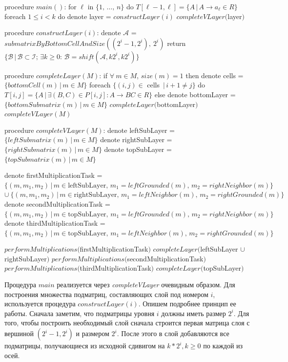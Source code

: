 \documentclass[a4paper,12pt]{article}  %
\theoremstyle{definition}
\theoremstyle{remark}
\begin{document}
\begin{algorithm}[caption={Модифицорованный алгоритм синтаксического анализа}, label={alg:modified}]
procedure $main()$:
  for $\ell$ in $\{1,\,\dots,\,n\}$ do
    $T[\ell-1, \ell] = \{A\,|\,A \to a_{\ell} \in R\}$
  foreach $1 \leqslant i < k$ do
    denote layer = $constructLayer(i)$
    $completeVLayer($layer$)$ 

procedure $constructLayer(i)$:
  denote $\mathcal{A}$ = $submatrixByBottomCellAndSize\left(\left(2^i-1,2^i\right),\ 2^i\right)$
  return $\{\mathcal{B}\,|\,\mathcal{B}\subset\mathcal{I};\,\exists k \geqslant 0:\, \mathcal{B} = shift(\mathcal{A}, k2^i, k2^i)\}$  

procedure $completeLayer(M)$:
  if $\forall\ m \in M$, $size(m) = 1$ then
    denote cells = $\{bottomCell(m)\,|\, m \in M\}$
    foreach $\{(i, j) \in $ cells $\,|\, i+1 \neq j\}$ do
      $T[i,j] = \{A\,|\,\exists (B,C) \in P[i,j]: A \to BC \in R\}$
  else
    denote bottomLayer = $\{bottomSubmatrix(m)\,|\,m \in M\}$
    $completeLayer($bottomLayer$)$
    $completeVLayer(M)$     

procedure $completeVLayer(M)$:
  denote leftSubLayer = $\{leftSubmatrix(m)\,|\,m \in M\}$
  denote rightSubLayer = $\{rightSubmatrix(m)\,|\,m \in M\}$
  denote topSubLayer = $\{topSubmatrix(m)\,|\,m \in M\}$

  denote firstMultiplicationTask = 
    $\{(m, m_1, m_2)\,|\,m \in \mbox{leftSubLayer},\,m_1 = leftGrounded(m),\,m_2 = rightNeighbor(m)\}$
    $\cup\ \{(m, m_1, m_2)\,|\,m \in \mbox{rightSubLayer},\,m_1 = leftNeighbor(m),\,m_2 = rightGrounded(m)\}$
  denote secondMultiplicationTask = 
    $\{(m, m_1, m_2)\,|\,m \in \mbox{topSubLayer},\,m_1 = leftGrounded(m),\,m_2 = rightNeighbor(m)\}$
  denote thirdMultiplicationTask = 
    $\{(m, m_1, m_2)\,|\,m \in \mbox{topSubLayer},\,m_1 = leftNeighbor(m),\,m_2 = rightGrounded(m)\}$

  $performMultiplications($firstMultiplicationTask$)$
  $completeLayer($leftSubLayer $\cup$ rightSubLayer$)$
  $performMultiplications($secondMultiplicationTask$)$
  $performMultiplications($thirdMultiplicationTask$)$
  $completeLayer($topSubLayer$)$ 
\end{algorithm}

Процедура $main$ реализуется через \textit{completeVLayer} очевидным образом. Для построения множества подматриц, составляющих слой под номером $i$, используется процедура \linebreak $constructLayer(i)$. Опишем подробнее принцип ее работы. Сначала заметим, что подматрицы уровня $i$ должны иметь размер $2^i$. Для того, чтобы построить необходимый слой сначала строится первая матрица слоя с вершиной $(2^i-1, 2^i)$ и размером $2^i$. После этого в слой добавляются все подматрицы, получающиеся из исходной сдивигом на $k*2^i, k\geqslant 0$ по каждой из осей.
\end{document}
